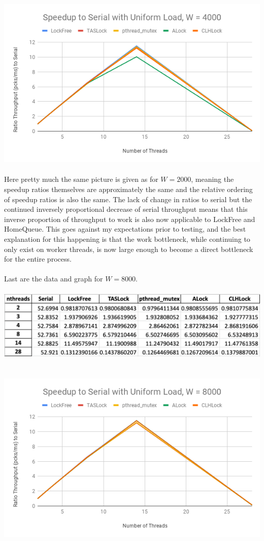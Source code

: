 \documentclass{article}
\begin{document}
\begin{adjustwidth}{-2cm}{-2cm}
\null\\
\includegraphics[width=\linewidth]{b_uni4000Graph.png}\\ \null\\
Here pretty much the same picture is given as for $W=2000$, meaning the speedup ratios themselves are approximately the same and the relative ordering of speedup ratios is also the same. The lack of change in ratios to serial but the continued inversely proportional decrease of serial throughput means that this inverse proportion of throughput to work is also now applicable to LockFree and HomeQueue. This goes against my expectations prior to testing, and the best explanation for this happening is that the work bottleneck, while continuing to only exist on worker threads, is now large enough to become a direct bottleneck for the entire process.\\
\null\\Last are the data and graph for $W=8000$.\\
\null\\
\includegraphics[width=\linewidth]{b_uni8000Data.png}\\ \null\\
\null\\
\includegraphics[width=\linewidth]{b_uni8000Graph.png}\\ \null\\

\end{adjustwidth}
\end{document}
